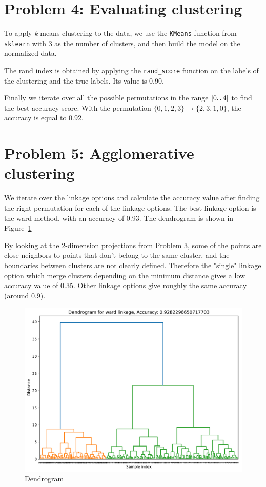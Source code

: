 \documentclass[a4paper]{article}
\begin{document}
\section*{Problem 4: Evaluating clustering}
To apply \textit{k}-means clustering to the data, we use the \verb|KMeans| function from \verb|sklearn| with 3 as the number of clusters, and then build the model on the normalized data.

The rand index is obtained by applying the \verb|rand_score| function on the labels of the clustering and the true labels. Its value is 0.90.

Finally we iterate over all the possible permutations in the range $ [0\ldotp\ldotp4] $ to find the best accuracy score. With the permutation $\{0, 1, 2, 3\} \rightarrow \{2, 3, 1, 0\}$, the accuracy is equal to 0.92.

\section*{Problem 5: Agglomerative clustering}
We iterate over the linkage options and calculate the accuracy value after finding the right permutation for each of the linkage options. The best linkage option is the ward method, with an accuracy of 0.93.
The dendrogram is shown in Figure~\ref{fig:dendrogram}

By looking at the 2-dimension projections from Problem 3, some of the points are close neighbors to points that don't belong to the same cluster, and the boundaries between clusters are not clearly defined.
Therefore the "single" linkage option which merge clusters depending on the minimum distance gives a low accuracy value of 0.35.
Other linkage options give roughly the same accuracy (around 0.9).

\begin{figure}[H]
  \begin{center}
    \includegraphics[width=\textwidth]{ola/dendrogram.pdf}
    \caption{Dendrogram}
    \label{fig:dendrogram}
  \end{center}
\end{figure}
\end{document}
